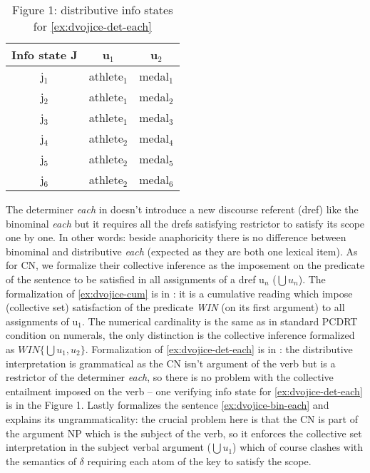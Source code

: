 \documentclass[12pt, a4paper]{scrartcl}
\begin{document}
\begin{wraptable}{l}{0.37\linewidth}
\begin{tabular}{|c|c|c|}
\hline 
Info state J & u$_1$ & u$_2$ \\ 
\hline 
j$_1$ & athlete$_1$ & medal$_1$ \\ 
\hline 
j$_2$ & athlete$_1$ & medal$_2$ \\ 
\hline 
j$_3$ & athlete$_1$ & medal$_3$ \\ 
\hline 
j$_4$ & athlete$_2$ & medal$_4$ \\ 
\hline 
j$_5$ & athlete$_2$ & medal$_5$ \\ 
\hline 
j$_6$ & athlete$_2$ & medal$_6$ \\ 
\hline 
\end{tabular} 
\caption{Figure 1: distributive info states for \ref{ex:dvojice-det-each}}
\end{wraptable}
The determiner \textit{each} in \Next[c] doesn't introduce a new discourse referent (dref) like the binominal \textit{each} but it requires all the drefs satisfying restrictor to satisfy its scope one by one. In other words: beside anaphoricity there is no difference between binominal and distributive \textit{each} (expected as they are both one lexical item). As for CN, we formalize their collective inference as the imposement on the predicate of the sentence to be satisfied in all assignments of a dref u$_n$ ($\bigcup u_n$). The formalization of \ref{ex:dvojice-cum} is in \NNext[a]: it is a cumulative reading which impose (collective set) satisfaction of the predicate \textit{WIN} (on its first argument) to all assignments of u$_1$. The numerical cardinality is the same as in standard PCDRT condition on numerals, the only distinction is the collective inference formalized as $WIN\{\bigcup u_1,u_2\}$. Formalization of \ref{ex:dvojice-det-each} is in \NNext[b]: the distributive interpretation is grammatical as the CN isn't argument of the verb but is a restrictor of the determiner \textit{each}, so there is no problem with the collective entailment imposed on the verb -- one verifying info state for \ref{ex:dvojice-det-each} is in the Figure 1. Lastly \NNext[c] formalizes the sentence \ref{ex:dvojice-bin-each} and explains its ungrammaticality: the crucial problem here is that the CN is part of the argument NP which is the subject of the verb, so it enforces the collective set interpretation in the subject verbal argument ($\bigcup u_1$) which of course clashes with the semantics of $\delta$ requiring each atom of the key to satisfy the scope. 
\end{document}
